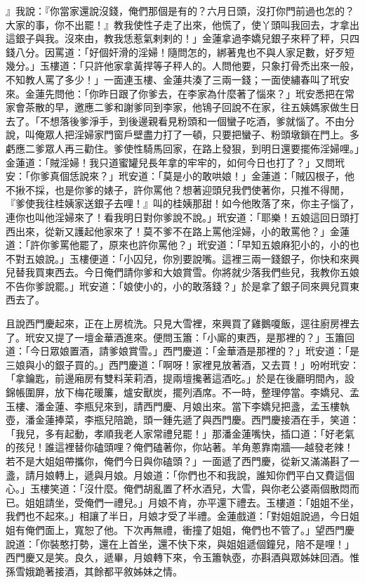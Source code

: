\begin{showcontents}{}
』我說：『你當家還說沒錢，俺們那個是有的？六月日頭，沒打你門前過也怎的？大家的事，你不出罷！』教我使性子走了出來，他慌了，使丫頭叫我回去，才拿出這銀子與我。沒來由，教我恁惹氣剌剌的！」金蓮拿過李嬌兒銀子來秤了秤，只四錢八分。因罵道：「好個奸滑的淫婦！隨問怎的，綁著鬼也不與人家足數，好歹短幾分。」玉樓道：「只許他家拿黃捍等子秤人的。人問他要，只象打骨禿出來一般，不知教人罵了多少！」一面連玉樓、金蓮共湊了三兩一錢；一面使繡春叫了玳安來。金蓮先問他：「你昨日跟了你爹去，在李家為什麼著了惱來？」玳安悉把在常家會茶散的早，邀應二爹和謝爹同到李家，他鴇子回說不在家，往五姨媽家做生日去了。「不想落後爹淨手，到後邊親看見粉頭和一個蠻子吃酒，爹就惱了。不由分說，叫俺眾人把淫婦家門窗戶壁盡力打了一頓，只要把蠻子、粉頭墩鎖在門上。多虧應二爹眾人再三勸住。爹使性騎馬回家，在路上發狠，到明日還要擺佈淫婦哩。」金蓮道：「賊淫婦！我只道蜜罐兒長年拿的牢牢的，如何今日也打了？」又問玳安：「你爹真個恁說來？」玳安道：「莫是小的敢哄娘！」金蓮道：「賊囚根子，他不揪不採，也是你爹的婊子，許你罵他？想著迎頭兒我們使著你，只推不得閒， 『爹使我往桂姨家送銀子去哩！』叫的桂姨那甜！如今他敗落了來，你主子惱了，連你也叫他淫婦來了！看我明日對你爹說不說。」玳安道：「耶樂！五娘這回日頭打西出來，從新又護起他家來了！莫不爹不在路上罵他淫婦，小的敢罵他？」金蓮道：「許你爹罵他罷了，原來也許你罵他？」玳安道：「早知五娘麻犯小的，小的也不對五娘說。」玉樓便道：「小囚兒，你別要說嘴。這裡三兩一錢銀子，你快和來興兒替我買東西去。今日俺們請你爹和大娘賞雪。你將就少落我們些兒，我教你五娘不告你爹說罷。」玳安道：「娘使小的，小的敢落錢？」於是拿了銀子同來興兒買東西去了。

且說西門慶起來，正在上房梳洗。只見大雪裡，來興買了雞鵝嗄飯，逕往廚房裡去了。玳安又提了一壇金華酒進來。便問玉簫：「小廝的東西，是那裡的？」玉簫回道：「今日眾娘置酒，請爹娘賞雪。」西門慶道：「金華酒是那裡的？」玳安道：「是三娘與小的銀子買的。」西門慶道：「啊呀！家裡見放著酒，又去買！」吩咐玳安：「拿鑰匙，前邊廂房有雙料茉莉酒，提兩壇攙著這酒吃。」於是在後廳明間內，設錦帳圍屏，放下梅花暖簾，爐安獸炭，擺列酒席。不一時，整理停當。李嬌兒、孟玉樓、潘金蓮、李瓶兒來到，請西門慶、月娘出來。當下李嬌兒把盞，孟玉樓執壺，潘金蓮捧菜，李瓶兒陪跪，頭一鍾先遞了與西門慶。西門慶接酒在手，笑道：「我兒，多有起動，孝順我老人家常禮兒罷！」那潘金蓮嘴快，插口道：「好老氣的孩兒！誰這裡替你磕頭哩？俺們磕著你，你站著。羊角蔥靠南牆──越發老辣！若不是大姐姐帶攜你，俺們今日與你磕頭？」一面遞了西門慶，從新又滿滿斟了一盞，請月娘轉上，遞與月娘。月娘道：「你們也不和我說，誰知你們平白又費這個心。」玉樓笑道：「沒什麼。俺們胡亂置了杯水酒兒，大雪，與你老公婆兩個散悶而已。姐姐請坐，受俺們一禮兒。」月娘不肯，亦平還下禮去。玉樓道：「姐姐不坐，我們也不起來。」相讓了半日，月娘才受了半禮。金蓮戲道：「對姐姐說過，今日姐姐有俺們面上，寬恕了他。下次再無禮，衝撞了姐姐，俺們也不管了。」望西門慶說道：「你裝憨打勢，還在上首坐，還不快下來，與姐姐遞個鐘兒，陪不是哩！」西門慶又是笑。良久，遞畢，月娘轉下來，令玉簫執壺，亦斟酒與眾姊妹回酒。惟孫雪娥跪著接酒，其餘都平敘姊妹之情。


\end{showcontents}
